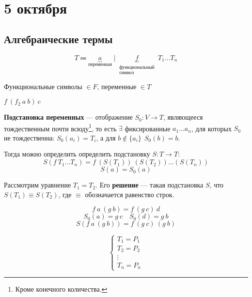 \chapter{5 октября}

\section{Алгебраические термы}

\begin{definition}
    \[T \Coloneqq \underbrace{a}_{\text{переменная}} \mid \underbrace{f}_{\substack{\text{функциональный} \\ \text{символ}}}\ T_1 \dots T_n\]

    Функциональные символы \(\in F\), переменные \(\in T\)
\end{definition}

\begin{example}
    \(f\ (f_2\ a\ b)\ c\)
\end{example}

\begin{definition}
    \textbf{Подстановка переменных} --- отображение \(S_0 : V \to T\), являющееся тождественным почти всюду\footnote{Кроме конечного количества.}, то есть \(\exists \) фиксированные \(a_1 \dots a_n\), для которых \(S_0\) не тождественна: \(S_0(a_i) = T_i\), а для \(b \notin \{a_i\} \ \ S_0(b) = b\).

    Тогда можно определить определить подстановку \(S : T \to T\):
    \[S(f\ T_1 \dots T_n) = f\ (S(T_1))\ (S(T_2)) \dots (S(T_n))\]
    \[S(a) = S_0(a)\]
\end{definition}

\begin{definition}
    Рассмотрим уравнение \(T_1 = T_2\). Его \textbf{решение} --- такая подстановка \(S\), что \(S(T_1) \equiv S(T_2)\), где \(\equiv\) обозначается равенство строк.
\end{definition}

\begin{example}
    \[f\ a\ (g\ b) = f\ (g\ c)\ d\]
    \[S_0(a) = g\ c \quad S_0(d) = g\ b\]
    \[S(f\ a\ (g\ b)) = f\ (g\ c)\ (g\ b)\]
\end{example}

\begin{definition}
    \[\begin{cases}
            T_1 = P_1 \\
            T_2 = P_2 \\
            \vdots    \\
            T_n = P_n
        \end{cases}\]
\end{definition}

